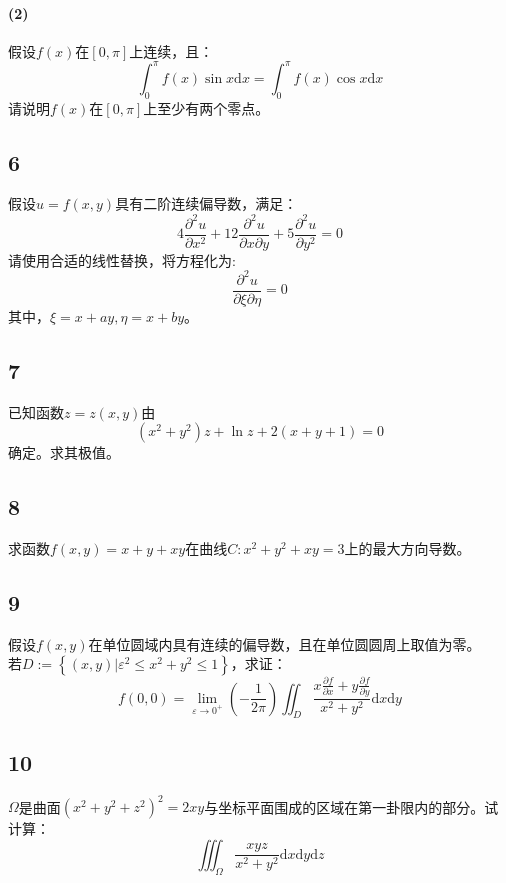 \documentclass[a4paper,12pt]{article}
\begin{document}
\paragraph{(2)}假设$f(x)$在$\left[0,\pi\right]$上连续，且：
\begin{equation*}
	\int_{0}^{\pi}f(x)\sin x\mathrm{d}x=\int_{0}^{\pi}f(x)\cos x\mathrm{d}x
\end{equation*}
请说明$f(x)$在$\left[0,\pi\right]$上至少有两个零点。
\subsection*{6}\noindent 假设$u=f\left(x,y\right)$具有二阶连续偏导数，满足：
\begin{equation*}
	4\frac{\partial^2 u}{\partial x^2}+12\frac{\partial^2 u}{\partial x\partial y}+5\frac{\partial^2 u}{\partial y^2}=0
\end{equation*}
请使用合适的线性替换，将方程化为:
\begin{equation*}
	\frac{\partial ^2 u}{\partial \xi \partial \eta}=0
\end{equation*}
其中，$\xi = x+ay,\eta =x+by$。
\subsection*{7}\noindent
已知函数$z=z(x,y)$由
\begin{equation*}
	\left(x^2+y^2\right)z+\ln z+2(x+y+1)=0
\end{equation*}确定。求其极值。
\subsection*{8}\noindent 求函数$f(x,y)=x+y+xy$在曲线$C:x^2+y^2+xy=3$上的最大方向导数。
\subsection*{9}\noindent
假设$f(x,y)$在单位圆域内具有连续的偏导数，且在单位圆圆周上取值为零。\\若$D:=\left\{(x,y)|\varepsilon^2\leq x^2+y^2\leq 1\right\}$，求证：
\begin{equation*}
	f(0,0)=\lim\limits_{\varepsilon\rightarrow 0^{+}}(-\frac{1}{2\pi})\iint_{D}\frac{x\frac{\partial f}{\partial x}+y\frac{\partial f}{\partial y}}{x^2+y^2}\mathrm{d}x\mathrm{d}y
\end{equation*}
\subsection*{10}
\noindent$\Omega$是曲面$(x^2+y^2+z^2)^2=2xy$与坐标平面围成的区域在第一卦限内的部分。试计算：
\begin{equation*}
	\iiint_{\Omega}\frac{xyz}{x^2+y^2}\mathrm{d}x\mathrm{d}y\mathrm{d}z
\end{equation*}
\end{document}
